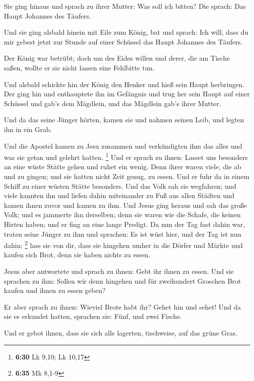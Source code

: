  Sie ging hinaus und sprach zu ihrer Mutter: Was soll ich
bitten? Die sprach: Das Haupt Johannes des Täufers.

 Und sie ging alsbald hinein mit Eile zum König, bat und
sprach: Ich will, dass du mir gebest jetzt zur Stunde auf einer Schüssel
das Haupt Johannes des Täufers.

 Der König war betrübt; doch um des Eides willen und derer,
die am Tische saßen, wollte er sie nicht lassen eine Fehlbitte tun.

 Und alsbald schickte hin der König den Henker und hieß
sein Haupt herbringen. Der ging hin und enthauptete ihn im Gefängnis
 und trug her sein Haupt auf einer Schüssel und gab's dem
Mägdlein, und das Mägdlein gab's ihrer Mutter.

 Und da das seine Jünger hörten, kamen sie und nahmen
seinen Leib, und legten ihn in ein Grab.

 Und die Apostel kamen zu Jesu zusammen und verkündigten
ihm das alles und was sie getan und gelehrt hatten. \footnote{\textbf{6:30}
  Lk 9,10; Lk 10,17}  Und er sprach zu ihnen: Lasset uns
besonders an eine wüste Stätte gehen und ruhet ein wenig. Denn ihrer
waren viele, die ab und zu gingen; und sie hatten nicht Zeit genug, zu
essen.  Und er fuhr da in einem Schiff zu einer wüsten
Stätte besonders.  Und das Volk sah sie wegfahren; und
viele kannten ihn und liefen dahin miteinander zu Fuß aus allen Städten
und kamen ihnen zuvor und kamen zu ihm.  Und Jesus ging
heraus und sah das große Volk; und es jammerte ihn derselben; denn sie
waren wie die Schafe, die keinen Hirten haben; und er fing an eine lange
Predigt.  Da nun der Tag fast dahin war, traten seine
Jünger zu ihm und sprachen: Es ist wüst hier, und der Tag ist nun dahin;
\footnote{\textbf{6:35} Mk 8,1-9}  lass sie von dir, dass
sie hingehen umher in die Dörfer und Märkte und kaufen sich Brot, denn
sie haben nichts zu essen.

 Jesus aber antwortete und sprach zu ihnen: Gebt ihr ihnen
zu essen. Und sie sprachen zu ihm: Sollen wir denn hingehen und für
zweihundert Groschen Brot kaufen und ihnen zu essen geben?

 Er aber sprach zu ihnen: Wieviel Brote habt ihr? Gehet hin
und sehet! Und da sie es erkundet hatten, sprachen sie: Fünf, und zwei
Fische.

 Und er gebot ihnen, dass sie sich alle lagerten,
tischweise, auf das grüne Gras.

